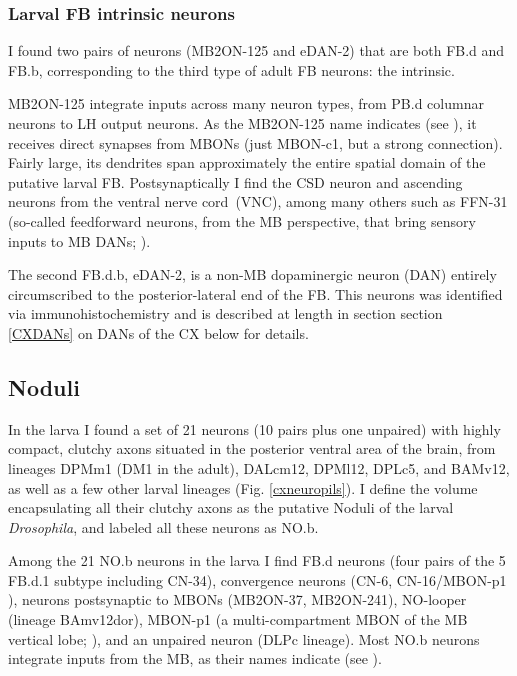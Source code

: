          \subsubsection{Larval FB intrinsic neurons}

    I found two pairs of neurons (MB2ON-125 and eDAN-2) that are both FB.d and FB.b, corresponding to the third type of adult FB neurons: the intrinsic.

    MB2ON-125 integrate inputs across many neuron types, from PB.d columnar neurons to LH output neurons.
    As the MB2ON-125 name indicates (see \citep{eschbach2021circuits}), it receives direct synapses from MBONs (just MBON-c1, but a strong connection).
    Fairly large, its dendrites span approximately the entire spatial domain of the putative larval FB.  Postsynaptically I find the CSD neuron \citep{berck2016wiring} and ascending neurons from the ventral nerve cord~(VNC), among many others such as FFN-31 (so-called feedforward neurons, from the MB perspective, that bring sensory inputs to MB DANs; \citep{eschbach2021circuits}).

    The second FB.d.b, eDAN-2, is a non-MB dopaminergic neuron (DAN) entirely circumscribed to the posterior-lateral end of the FB. This neurons was identified via immunohistochemistry and is described at length in section section \ref{CXDANs} on DANs of the CX below for details.
    
     \subsection{Noduli}
    \label{NO}

    In the larva I found a set of 21 neurons (10 pairs plus one unpaired) with highly compact, clutchy axons situated in the posterior ventral area of the brain, from lineages DPMm1 (DM1 in the adult), DALcm12, DPMl12, DPLc5, and BAMv12, as well as a few other larval lineages (Fig. \ref{cxneuropils}).
    I define the volume encapsulating all their clutchy axons as the putative Noduli of the larval \textit{Drosophila}, and labeled all these neurons as NO.b.

    Among the 21 NO.b neurons in the larva I find FB.d neurons (four pairs of the 5 FB.d.1 subtype including CN-34), convergence neurons (CN-6, CN-16/MBON-p1 \citep{eschbach2020recurrent}), neurons postsynaptic to MBONs (MB2ON-37, MB2ON-241), NO-looper (lineage BAmv12dor), MBON-p1 (a multi-compartment MBON of the MB vertical lobe; \citep{eichler2017complete}), and an unpaired neuron (DLPc lineage). Most NO.b neurons integrate inputs from the MB, as their names indicate (see \citep{eschbach2021circuits}).

